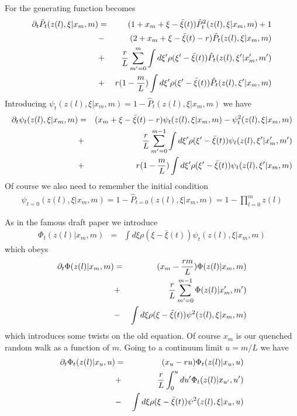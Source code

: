 \documentclass{article}
\begin{document}
For the generating function becomes
\begin{eqnarray}
\partial_t \hat{P}_t (z(l),\xi | x_m,m)&=& 
(1+x_m+\xi-{\bar \xi}(t)) \hat{ P}_{t}^2 (z(l),\xi | x_m,m)+1\\
&-&(2+x_m+\xi-{\bar \xi}(t)-r) \hat{ P}_{t} (z(l),\xi | x_m,m)\\
&+& {r  \over L} \sum_{m'=0}^m  \int d\xi' \rho(\xi'-{\bar \xi}(t)) \hat{ P}_{t} (z(l),\xi' | x_m',m')\\
&+& r (1-{m \over L}) \int d\xi' \rho(\xi'-{\bar \xi}(t)) \hat{ P}_{t} (z(l),\xi' | x_m,m)
\end{eqnarray}
Introducing $\psi_t (z(l),\xi | x_m,m)=1-\hat{P}_t (z(l),\xi | x_m,m)$ we have
\begin{eqnarray}
\partial_t \psi_t (z(l),\xi | x_m,m)&=& (x_m+\xi-{\bar \xi}(t)-r) \psi_t (z(l),\xi | x_m,m)
- \psi_t^2 (z(l),\xi | x_m,m)\\
&+& {r  \over L} \sum_{m'=0}^{m-1}  \int d\xi' \rho(\xi'-{\bar \xi}(t)) \psi_t (z(l),\xi' | x_m',m')\\
&+& r (1-{m \over L}) \int d\xi' \rho(\xi'-{\bar \xi}(t)) \psi_t (z(l),\xi' | x_m,m)
\end{eqnarray}
Of course we also need to remember the initial condition
\begin{eqnarray}
\psi_{t=0} (z(l),\xi | x_m,m)=1-\hat{P}_{t=0} (z(l),\xi | x_m,m)=1-\prod_{l=0}^m z(l)
\end{eqnarray}

As in the famous draft paper we introduce
\begin{eqnarray}
\Phi_t (z(l) | x_m,m)&=&\int d\xi \rho(\xi-{\bar \xi}(t)) \psi_{t} (z(l),\xi | x_m,m)
\end{eqnarray}
which obeys
\begin{eqnarray}
\partial_t \Phi (z(l)| x_m,m)&=& (x_m-{rm \over L} ) \Phi (z(l) | x_m,m)\\
&+& {r  \over L} \sum_{m'=0}^{m-1}   \Phi (z(l)| x_m',m')\\
&-& \int d\xi \rho( \xi-{\bar \xi}(t) ) \psi^2 (z(l),\xi | x_m,m)\\
\end{eqnarray}
which introduces some twists on the old equation. Of course $x_m$ is our quenched random walk as a function of $m$. Going to a continuum limit $u=m/L$ we have
\begin{eqnarray}
\partial_t \Phi_t (z(l)| x_u,u)&=& (x_u-ru ) \Phi_t (z(l) | x_u,u)\\
&+& {r  \over L} \int_{0}^u du'  \Phi_t (z(l)| x_{u'},u')\\
&-& \int d\xi \rho( \xi-{\bar \xi}(t) ) \psi^2 (z(l),\xi | x_u,u)\\
\end{eqnarray}
\end{document}
